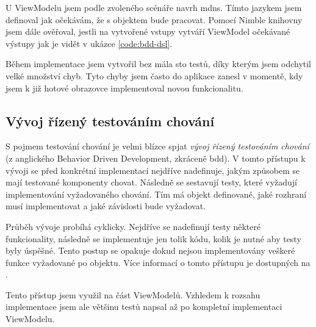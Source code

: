 U ViewModelu jsem podle zvoleného scénáře navrh \acrshort{mdns}.
Tímto jazykem jsem definoval jak očekávám, že s objektem bude pracovat.
Pomocí Nimble knihovny jsem dále ověřoval, jestli na vytvořené vstupy vytváří ViewModel očekávané výstupy jak je vidět v ukázce \ref{code:bdd-dsl}.

Během implementace jsem vytvořil bez mála sto testů, díky kterým jsem odchytil velké množství chyb.
Tyto chyby jsem často do aplikace zanesl v momentě, kdy jsem k již hotové obrazovce implementoval novou funkcionalitu.


\subsection{Vývoj řízený testováním chování}

S pojmem testování chování je velmi blízce spjat \textit{vývoj řízený testováním chování} (z anglického Behavior Driven Development, zkráceně \acrshort{bdd}).
V tomto přístupu k vývoji se před konkrétní implementací nejdříve nadefinuje, jakým způsobem se mají testované komponenty chovat.
Následně se sestavují testy, které vyžadují implementování vyžadovaného chování.
Tím má objekt definované, jaké rozhraní musí implementovat a jaké závislosti bude vyžadovat.

Průběh vývoje probíhá cyklicky.
Nejdříve se nadefinují testy některé funkcionality, následně se implementuje jen tolik kódu, kolik je nutné aby testy byly úspěšné.
Tento postup se opakuje dokud nejsou implementovány veškeré funkce vyžadované po objektu.
Více informací o tomto přístupu je dostupných na \cite{objcio-bdd}.

Tento přístup jsem využil na část ViewModelů.
Vzhledem k rozsahu implementace jsem ale většinu testů napsal až po kompletní implementaci ViewModelu.
